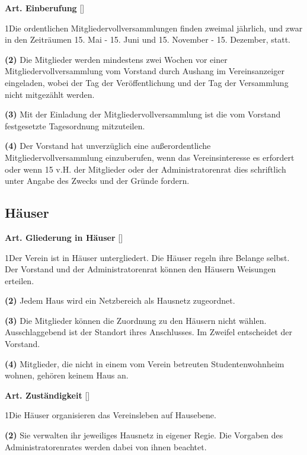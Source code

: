 \documentclass[12pt]{article}
\newcommand{\UAbschnitt}[1]{\subsection{#1}}
\newcommand{\Satz}[2]{

\begin{samepage}
{\bf (#1)} #2
\end{samepage}
}
\newenvironment{Artikel}[2]{
\bigskip \centerline{{\bf Art. #1} [#2]}
\nopagebreak
}{
}
\begin{document}
\begin{Artikel}{16}{Einberufung}

\Satz{1}{Die ordentlichen Mitgliedervollversammlungen finden zweimal jährlich,
und zwar in den Zeiträumen 15. Mai - 15. Juni und 15. November - 15. Dezember, statt.}

\Satz{2}{Die Mitglieder werden mindestens zwei Wochen vor einer
Mitgliedervollversammlung vom Vorstand durch Aushang im Vereinsanzeiger
eingeladen, wobei der Tag der Ver\-öffent\-lichung und der Tag der Versammlung
nicht mitgezählt werden.}

\Satz{3}{Mit der Einladung der Mitgliedervollversammlung ist die vom Vorstand
festgesetzte Tagesordnung mitzuteilen.}

\Satz{4}{Der Vorstand hat unverzüglich  eine außerordentliche
Mitgliedervollversammlung einzuberufen, wenn das Vereinsinteresse es erfordert
oder wenn 15 v.H. der Mitglieder oder der Administratorenrat dies schriftlich
unter Angabe des Zwecks und der Gründe fordern.}

\end{Artikel}

\UAbschnitt{Häuser} 

\begin{Artikel}{17}{Gliederung in Häuser}

\Satz{1}{Der Verein ist in Häuser untergliedert. Die Häuser regeln ihre Belange
selbst. Der Vorstand und der Administratorenrat können den Häusern Weisungen
erteilen.}

\Satz{2}{Jedem Haus wird ein Netzbereich als Hausnetz zugeordnet.}

\Satz{3}{Die Mitglieder können die Zuordnung zu den Häusern nicht wählen. 
Ausschlaggebend ist der Standort ihres Anschlusses. Im Zweifel entscheidet der
Vorstand.}

\Satz{4}{Mitglieder, die nicht in einem vom Verein betreuten Studentenwohnheim
wohnen, gehören keinem Haus an.}

\end{Artikel}

\begin{Artikel}{18}{Zuständigkeit}

\Satz{1}{Die Häuser organisieren das Vereinsleben auf Hausebene.}

\Satz{2}{Sie verwalten ihr jeweiliges Hausnetz in eigener Regie. Die Vorgaben
des Administratorenrates werden dabei von ihnen beachtet.}

\end{Artikel}
\end{document}
